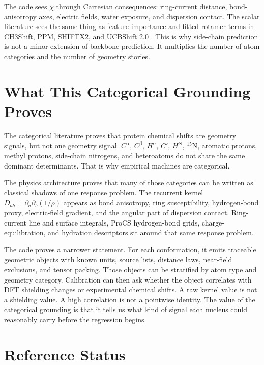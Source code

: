 \documentclass[11pt]{article}
\begin{document}
The code sees \(\chi\) through Cartesian consequences: ring-current distance,
bond-anisotropy axes, electric fields, water exposure, and dispersion contact.
The scalar literature sees the same thing as feature importance and fitted
rotamer terms in CH3Shift, PPM, SHIFTX2, and UCBShift 2.0
\cite{han2011,sahakyan2011,li2012,ptaszek2024}. This is why side-chain
prediction is not a minor extension of backbone prediction. It multiplies the
number of atom categories and the number of geometry stories.

\section{What This Categorical Grounding Proves}

The categorical literature proves that protein chemical shifts are geometry
signals, but not one geometry signal. \(C^\alpha\), \(C^\beta\), \(H^\alpha\),
\(C'\), \(H^\mathrm N\), \(^{15}\mathrm N\), aromatic protons, methyl protons,
side-chain nitrogens, and heteroatoms do not share the same dominant
determinants. That is why empirical machines are categorical.

The physics architecture proves that many of those categories can be written as
classical shadows of one response problem. The recurrent kernel
\(D_{ab}=\partial_a\partial_b(1/\rho)\) appears as bond anisotropy, ring
susceptibility, hydrogen-bond proxy, electric-field gradient, and the angular
part of dispersion contact. Ring-current line and surface integrals, ProCS
hydrogen-bond grids, charge-equilibration, and hydration descriptors sit around
that same response problem.

The code proves a narrower statement. For each conformation, it emits
traceable geometric objects with known units, source lists, distance laws,
near-field exclusions, and tensor packing. Those objects can be stratified by
atom type and geometry category. Calibration can then ask whether the object
correlates with DFT shielding changes or experimental chemical shifts. A raw
kernel value is not a shielding value. A high correlation is not a pointwise
identity. The value of the categorical grounding is that it tells us what kind
of signal each nucleus could reasonably carry before the regression begins.

\section{Reference Status}
\end{document}
